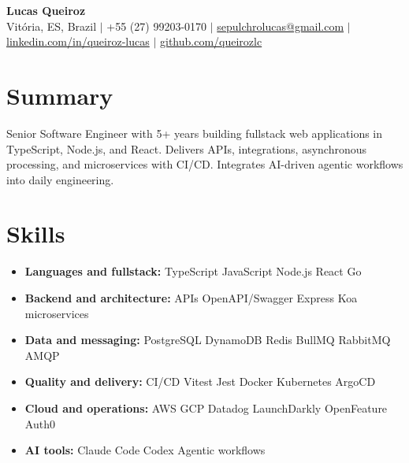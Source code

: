 \documentclass[letterpaper,10pt]{article}
\newcommand{\resumeItem}[1]{\item\small{#1}}
\newcommand{\resumeSubHeadingList}{\begin{itemize}[leftmargin=0.15in, label={}, nosep]}
\newcommand{\resumeSubHeadingListEnd}{\end{itemize}}
\begin{document}
\begin{center}
  \textbf{\Huge Lucas Queiroz} \\[3pt]
  \small Vit\'oria, ES, Brazil $|$ +55 (27) 99203-0170 $|$ \href{mailto:sepulchrolucas@gmail.com}{sepulchrolucas@gmail.com} $|$
  \href{https://linkedin.com/in/queiroz-lucas}{linkedin.com/in/queiroz-lucas} $|$
  \href{https://github.com/queirozlc}{github.com/queirozlc}
\end{center}
\vspace{2pt}

\section{Summary}
Senior Software Engineer with 5+ years building fullstack web applications in TypeScript, Node.js, and React. Delivers APIs, integrations, asynchronous processing, and microservices with CI/CD. Integrates AI-driven agentic workflows into daily engineering.

\section{Skills}
\resumeSubHeadingList
\resumeItem{\textbf{Languages and fullstack:} TypeScript \textbar{} JavaScript \textbar{} Node.js \textbar{} React \textbar{} Go}
\resumeItem{\textbf{Backend and architecture:} APIs \textbar{} OpenAPI/Swagger \textbar{} Express \textbar{} Koa \textbar{} microservices}
\resumeItem{\textbf{Data and messaging:} PostgreSQL \textbar{} DynamoDB \textbar{} Redis \textbar{} BullMQ \textbar{} RabbitMQ \textbar{} AMQP}
\resumeItem{\textbf{Quality and delivery:} CI/CD \textbar{} Vitest \textbar{} Jest \textbar{} Docker \textbar{} Kubernetes \textbar{} ArgoCD}
\resumeItem{\textbf{Cloud and operations:} AWS \textbar{} GCP \textbar{} Datadog \textbar{} LaunchDarkly \textbar{} OpenFeature \textbar{} Auth0}
\resumeItem{\textbf{AI tools:} Claude Code \textbar{} Codex \textbar{} Agentic workflows}\resumeSubHeadingListEnd
\end{document}

